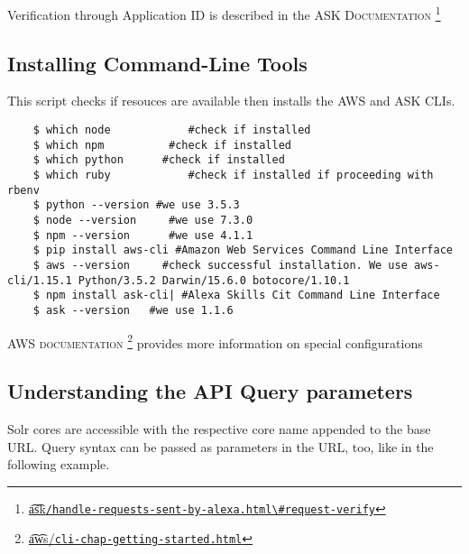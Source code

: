 Verification through Application ID is described in the \textsc{ASK Documentation} \footnote{\href{https://developer.amazon.com/docs/custom-skills/handle-requests-sent-by-alexa.html\#request-verify}{\t{a\t{sk}}\lstinline|/handle-requests-sent-by-alexa.html\#request-verify|}}


%
%
%
%	


\subsection*{Installing Command-Line Tools}
This script %
checks if resouces are available then installs the AWS and ASK CLIs.

\begin{verbatim}
	$ which node			#check if installed
	$ which npm			 #check if installed
	$ which python		#check if installed
	$ which ruby			#check if installed if proceeding with rbenv
	$ python --version #we use 3.5.3
	$ node --version	 #we use 7.3.0
	$ npm --version 	 #we use 4.1.1
	$ pip install aws-cli #Amazon Web Services Command Line Interface
	$ aws --version		#check successful installation. We use aws-cli/1.15.1 Python/3.5.2 Darwin/15.6.0 botocore/1.10.1
	$ npm install ask-cli| #Alexa Skills Cit Command Line Interface
	$ ask --version	  #we use 1.1.6
\end{verbatim}


\textsc{AWS documentation} \footnote{\href{https://docs.aws.amazon.com/cli/latest/userguide/cli-chap-getting-started.html}{\t{a\t{ws}}/\lstinline|cli-chap-getting-started.html|}} provides more information on special configurations





\subsection*{Understanding the API Query parameters}
Solr cores are accessible with the respective core name appended to the base URL.
Query syntax can be passed as parameters in the URL, too, like in the following example.



